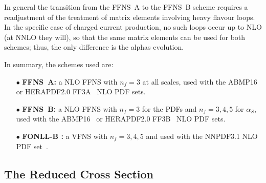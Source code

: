\documentclass[pdftex,twocolumn,epjc3]{svjour3}          %
\newcommand{\abmp} {ABMP16\xspace}
\newcommand{\nnpdf} {NNPDF3.1\xspace}
\newcommand{\ffns} {{FFNS~A}\xspace}
\newcommand{\ffnsb} {{FFNS~B}\xspace}
\newcommand{\ffthreea} {{\hbox{HERAPDF2.0} FF3A}\xspace}
\newcommand{\ffthreeb} {{\hbox{HERAPDF2.0} FF3B}\xspace}
\begin{document}
In general the transition from the FFNS~A to the
FFNS~B scheme requires a readjustment of the treatment of matrix elements 
involving heavy flavour loops. In the specific case of charged current production, 
no such loops occur up to NLO (at NNLO they will), so that the same 
matrix elements can be used for both schemes; thus, the only difference is 
the alphas evolution.
  
In summary, the schemes used are:
\begin{itemize}
  \setlength\itemsep{1em}

\item[$\bullet$] {\bf \ffns :} a NLO FFNS with $n_f = 3$ at all
  scales, used with the \abmp~\cite{Alekhin:2018pai} or
  \ffthreea~\cite{Abramowicz:2015mha} NLO PDF sets.

\item[$\bullet$] {\bf \ffnsb :} a NLO FFNS with $n_f = 3$ for the PDFs
  and $n_f = 3,4,5$ for $\alpha_S$, used with the
  \abmp~\cite{Alekhin:2018pai} or \ffthreeb~\cite{Abramowicz:2015mha}
  NLO PDF sets.

\item[$\bullet$] {\bf FONLL-B :} a VFNS with $n_f = 3,4,5$ and used
  with the \nnpdf NLO PDF set~\cite{Ball:2017nwa}.

\end{itemize}


\subsection{The Reduced Cross Section}\label{sec-redsigma}
\end{document}
